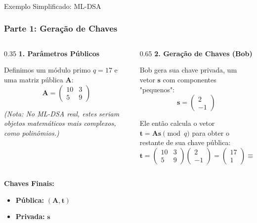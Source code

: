 \documentclass{beamer}
\begin{document}
\begin{frame}{Exemplo Simplificado: ML-DSA}
    \frametitle{Parte 1: Geração de Chaves}

    \begin{columns}[T] %
        
        \begin{column}{0.35\textwidth}
            \textbf{1. Parâmetros Públicos}
            \vspace{1em}
            
            Definimos um módulo primo $q=17$ e uma matriz pública $\mathbf{A}$:
            $$ \mathbf{A} = \begin{pmatrix} 10 & 3 \\ 5 & 9 \end{pmatrix} $$
            
            \vspace{1em}
            \footnotesize{\textit{(Nota: No ML-DSA real, estes seriam objetos matemáticos mais complexos, como polinômios.)}}
        \end{column}
        
        \begin{column}{0.65\textwidth}
            \textbf{2. Geração de Chaves (Bob)}
            \vspace{1em}
            
            Bob gera sua chave privada, um vetor $\mathbf{s}$ com componentes "pequenos":
            $$ \mathbf{s} = \begin{pmatrix} 2 \\ -1 \end{pmatrix} $$
            
            \pause
            Ele então calcula o vetor $\mathbf{t} = \mathbf{A}\mathbf{s} \pmod{q}$ para obter o restante de sua chave pública:
            $$ \mathbf{t} = \begin{pmatrix} 10 & 3 \\ 5 & 9 \end{pmatrix} \begin{pmatrix} 2 \\ -1 \end{pmatrix} = \begin{pmatrix} 17 \\ 1 \end{pmatrix} \equiv \begin{pmatrix} 0 \\ 1 \end{pmatrix} \pmod{17} $$
            
        \end{column}
        
    \end{columns}
    \pause
    \vspace{1em}
    \textbf{Chaves Finais:}
    \begin{itemize}
        \item \textbf{Pública:} $(\mathbf{A}, \mathbf{t})$
        \item \textbf{Privada:} $\mathbf{s}$
    \end{itemize}
\end{frame}
\end{document}
